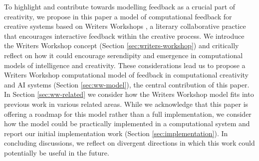 To highlight and contribute towards modelling feedback as a crucial part of creativity, we propose in this paper a model of computational feedback for creative systems based on Writers Workshops \cite{gabriel2002writer}, a literary collaborative practice that encourages interactive feedback within the creative process. We introduce the Writers Workshop concept (Section \ref{sec:writers-workshop}) and critically  reflect on how it could encourage serendipity and emergence in computational models of intelligence and creativity. These considerations lead us to propose a Writers Workshop computational model of feedback in computational creativity and AI systems (Section \ref{sec:ww-model}), the central contribution of this paper. In Section \ref{sec:ww-related} we consider how the Writers Workshop model fits into previous work in various related areas. 
While we acknowledge that this paper is offering a roadmap for this model rather than a full implementation, we consider how the model could be practically implemented in a computational system and report our initial implementation work (Section \ref{sec:implementation}). In concluding discussions, we reflect on divergent directions in which this work could potentially be useful in the future.



